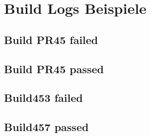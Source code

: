 \documentclass[accentcolor=tud0b,12pt,paper=a4]{tudreport}
\begin{document}
\section{Build Logs Beispiele}

\subsection{Build PR45 failed}



\subsection{Build PR45 passed}



\subsection{Build453 failed}



\subsection{Build457 passed}


\end{document}

